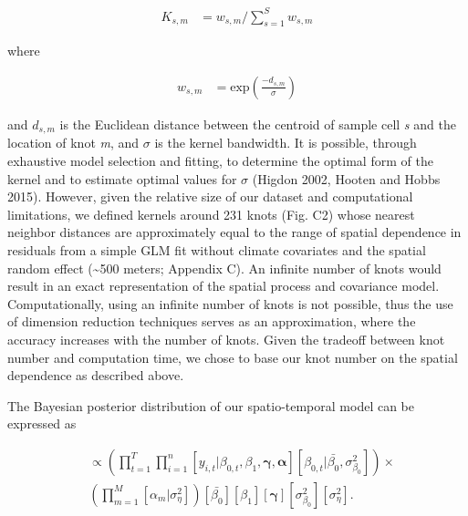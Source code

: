 \documentclass[12pt,]{article}
\begin{document}
\vspace{-4em}\begin{align}
K_{s,m} &= w_{s,m} / \sum_{s=1}^{S} w_{s,m}
\end{align}\vspace{-4em}

where

\vspace{-4em}\begin{align}
w_{s,m} &= \text{exp}\left(\frac{-d_{s,m}}{\sigma}\right)
\end{align}\vspace{-4em}

and \(d_{s,m}\) is the Euclidean distance between the centroid of sample
cell \emph{s} and the location of knot \emph{m}, and \(\sigma\) is the
kernel bandwidth. It is possible, through exhaustive model selection and
fitting, to determine the optimal form of the kernel and to estimate
optimal values for \(\sigma\) (Higdon 2002, Hooten and Hobbs 2015).
However, given the relative size of our dataset and computational
limitations, we defined kernels around 231 knots (Fig. C2) whose nearest
neighbor distances are approximately equal to the range of spatial
dependence in residuals from a simple GLM fit without climate covariates
and the spatial random effect (\textasciitilde{}500 meters; Appendix C).
An infinite number of knots would result in an exact representation of
the spatial process and covariance model. Computationally, using an
infinite number of knots is not possible, thus the use of dimension
reduction techniques serves as an approximation, where the accuracy
increases with the number of knots. Given the tradeoff between knot
number and computation time, we chose to base our knot number on the
spatial dependence as described above.

The Bayesian posterior distribution of our spatio-temporal model can be
expressed as

\vspace{-4em}\begin{align}
[\boldsymbol{\beta}, \boldsymbol{\gamma}, \boldsymbol{\alpha}, \sigma_{\eta}^2 | \textbf{y}] &\propto \left( \prod_{t=1}^{T} \prod_{i=1}^{n} [y_{i,t} | \beta_{0,t}, \beta_{1}, \boldsymbol{\gamma},\boldsymbol{\alpha}] [\beta_{0,t}|\bar{\beta_{0}}, \sigma_{\beta_{0}}^2] \right) \times \\
&\left(\prod_{m=1}^{M}[\alpha_m|\sigma_{\eta}^2]\right)[\bar{\beta_{0}}][\beta_{1}][\boldsymbol{\gamma}][\sigma_{\beta_{0}}^2][\sigma_{\eta}^2]. \nonumber
\end{align}\vspace{-4em}
\end{document}
